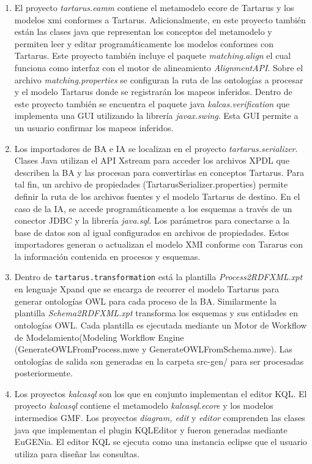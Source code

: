\begin{enumerate}

\item El proyecto \textit{tartarus.eamm} contiene el metamodelo ecore de Tartarus y los modelos xmi conformes a Tartarus. Adicionalmente, en este proyecto tambi\'en est\'an las clases java que representan los conceptos del metamodelo y permiten leer y editar program\'aticamente los modelos conformes con Tartarus. Este proyecto tambi\'en incluye el paquete \textit{matching.align} el cual funciona como interfaz con el motor de alineamiento \textit{AlignmentAPI}. Sobre el archivo \textit{matching.properties} se configuran la ruta de las ontolog\'ias a procesar y el modelo Tartarus donde se registrar\'an los mapeos inferidos. Dentro de este proyecto tambi\'en se encuentra el paquete java \textit{kalcas.verification} que implementa una GUI utilizando la librer\'ia \textit{javax.swing}. Esta GUI permite a un usuario confirmar los mapeos inferidos.

\item Los importadores de BA e IA se localizan en el proyecto \textit{tartarus.serializer}. Clases Java utilizan el API Xstream para acceder los archivos XPDL que describen la BA y las procesan para convertirlas en conceptos Tartarus. Para tal fin, un archivo de propiedades (TartarusSerializer.properties) permite definir la ruta de los archivos fuentes y el modelo Tartarus de destino. En el caso de la IA, se accede program\'aticamente a los esquemas a trav\'es de un conector JDBC y la librer\'ia \textit{java.sql}. Los par\'ametros para conectarse a la base de datos son al igual configurados en archivos de propiedades. Estos importadores generan o actualizan el modelo XMI conforme con Tararus con la informaci\'on contenida en procesos y esquemas.

\item Dentro de \texttt{tartarus.transformation} est\'a la plantilla \textit{Process2RDFXML.xpt} en lenguaje Xpand que se encarga de recorrer el modelo Tartarus para generar ontolog\'ias OWL para cada proceso de la BA. Similarmente la plantilla \textit{Schema2RDFXML.xpt} transforma los esquemas y sus entidades en ontolog\'ias OWL.  Cada plantilla es ejecutada mediante un Motor de Workflow de Modelamiento(Modeling Workflow Engine (GenerateOWLFromProcess.mwe y GenerateOWLFromSchema.mwe). Las ontolog\'ias de salida son generadas en la carpeta src-gen/ para ser procesadas posteriormente.

\item Los proyectos \textit{kalcasql} son los que en conjunto implementan el editor KQL. El proyecto \textit{kalcasql} contiene el metamodelo \textit{kalcasql.ecore} y los modelos intermedios GMF. Los proyectos \textit{diagram, edit} y \textit{editor} comprenden las clases java que implementan el plugin KQLEditor y fueron generadas mediante EuGENia. El editor KQL se ejecuta como una instancia eclipse que el usuario utiliza para dise\~nar las consultas.


\end{enumerate}
